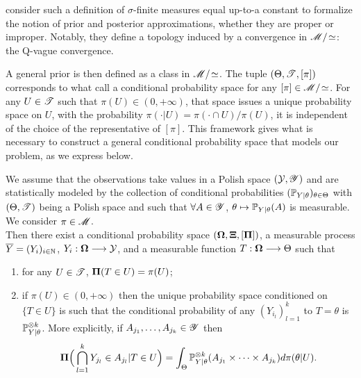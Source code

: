 \citet{bioche_approximation_2016} consider such a definition of $\sigma$-finite measures equal up-to-a constant to formalize the notion of prior and posterior approximations, whether they are proper or improper. Notably, they define a topology induced by a convergence in $\mathscr{M}/\!\simeq$: the Q-vague convergence. %


A general prior is then defined as a class in $\mathscr{M}/\!\simeq$.
The tuple $(\Theta,\mathscr{T},[\pi])$ corresponds to what \citet{taraldsen_conditional_2016} call a conditional probability space for any $[\pi]\in\mathscr{M}/\!\simeq$.
For any $U \in \mathscr{T}$ such that 
$\pi(U)\in (0,+\infty)$, 
that space issues a unique probability space on $U$, with the probability $\pi(\cdot|U)=\pi(\cdot\cap U)/\pi(U)$, it is independent of the choice of the representative of $[\pi]$.
This framework gives what is necessary to construct a general conditional probability space that models our problem, as we express below.


\begin{prop}\label{prop:intro-ref:kolmog}
We assume that the observations take values in a 
Polish space $(\mathcal{Y},\mathscr{Y})$ and are statistically modeled by the collection of conditional probabilities $(\mathbb{P}_{Y|\theta})_{\theta\in\Theta}$ with $(\Theta,\mathscr{T})$ being a Polish space and such that $\forall A\in\mathscr{Y}$, $\theta\mapsto\mathbb{P}_{Y|\theta}(A)$ is measurable. We consider $\pi\in\mathscr{M}$.\\
Then there exist a conditional probability space $(\mathbf{\Omega}, \mathbf{\Xi}, [\mathbf{\Pi}])$, a measurable process $\overline Y=(Y_i)_{i\in\mathbb{N}}$, $Y_i:\mathbf{\Omega}\longrightarrow\mathcal{Y}$, and a measurable function $T:\mathbf{\Omega}\longrightarrow\Theta$ such that
    \begin{enumerate}
        \item for any $U\in\mathscr{T}$, $\mathbf{\Pi}(T\in U)=\pi(U)$; 
        \item if 
        $\pi(U) \in  (0,+\infty)$ 
        then the unique probability space conditioned on $\{T\in U\}$ is such that the conditional probability of any $(Y_{i_l})_{l=1}^k$ to $T=\theta$ is $\mathbb{P}_{Y|\theta}^{\otimes k}$. More explicitly, if $A_{j_1},\dots,A_{j_k}\in\mathscr{Y}$ then
            \begin{equation}
                \mathbf{\Pi}\Big(\bigcap_{l=1}^kY_{j_l}\in A_{j_l}|T\in U\Big) = \int_\Theta\mathbb{P}_{Y|\theta}^{\otimes k}(A_{j_1}\times\dots\times A_{j_k})d\pi(\theta| U).
            \end{equation}
    \end{enumerate}
\end{prop}

